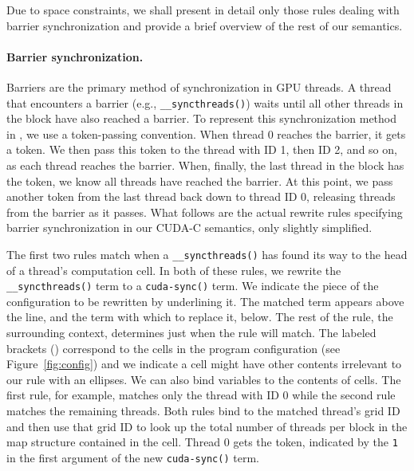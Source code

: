 Due to space constraints, we shall present in detail only those rules dealing
with barrier synchronization and provide a brief overview of the rest of our
semantics. 

\paragraph{Barrier synchronization.}
Barriers are the primary method of synchronization in GPU threads. A thread that
encounters a barrier (e.g., {\tt \_\_syncthreads()}) waits until all other
threads in the block have also reached a barrier. To represent this
synchronization method in \K, we use a token-passing convention. When thread 0
reaches the barrier, it gets a token. We then pass this token to the thread with
ID 1, then ID 2, and so on, as each thread reaches the barrier. When, finally,
the last thread in the block has the token, we know all threads have reached the
barrier. At this point, we pass another token from the last thread back down to
thread ID 0, releasing threads from the barrier as it passes. What follows are
the actual rewrite rules specifying barrier synchronization in our CUDA-C
semantics, only slightly simplified.

The first two rules match when a {\tt \_\_syncthreads()} has found its way to
the head of a thread's computation cell. In both of these rules, we rewrite the
{\tt \_\_syncthreads()} term to a {\tt cuda-sync()} term. We indicate the piece
of the configuration to be rewritten by underlining it. The matched term appears
above the line, and the term with which to replace it, below. The rest of the
rule, the surrounding context, determines just when the rule will match. The
labeled brackets () correspond to the cells in the
program configuration (see Figure~\ref{fig:config}) and we indicate a cell might
have other contents irrelevant to our rule with an ellipses. We can also bind
variables to the contents of cells. The first rule, for example, matches only
the thread with ID 0 while the second rule matches the remaining threads. Both
rules bind  to the matched thread's grid ID and then use that grid ID to
look up the total number of threads per block in the map structure contained in
the  cell. Thread 0 gets the token,
indicated by the {\tt 1} in the first argument of the new {\tt cuda-sync()}
term. 

